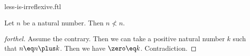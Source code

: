 \documentclass{stex}
\begin{document}
\begin{smodule}{less-is-irreflexive.ftl}


\begin{proposition}[forthel,id=LessIsIrreflexiveProp]
  Let $n$ be a natural number.
  Then $n \nless n$.
\end{proposition}
\begin{proof}[forthel]
  Assume the contrary.
  Then we can take a positive natural number $k$ such that $n \eq n \plus k$.
  Then we have $\zero \eq k$.
  Contradiction.
\end{proof}

\end{smodule}
\end{document}
